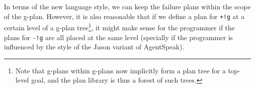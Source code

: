 \noindent In terms of the new language style, we can keep the failure plans within the scope of the
g-plan. However, it is also reasonable that if we define a plan for
\texttt{+!g} at a certain level of a g-plan tree\footnote{Note that
  g-plans within g-plans now implicitly form a plan tree for a
  top-level goal, and the plan library is thus a forest of such
  trees.}, it might make sense for the programmer if the plans for
\texttt{-!g} are all placed at the same level (specially if the
programmer is influenced by the style of the Jason variant of
AgentSpeak).

%



%
%
